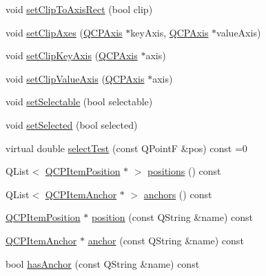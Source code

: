 \begin{DoxyCompactItemize}
\item 
void \hyperlink{classQCPAbstractItem_a39e05b9d4176b9accafc746d16ca6a06}{set\-Clip\-To\-Axis\-Rect} (bool clip)
\item 
void \hyperlink{classQCPAbstractItem_aa80abbbdcbfc40994443b03108160aee}{set\-Clip\-Axes} (\hyperlink{classQCPAxis}{Q\-C\-P\-Axis} $\ast$key\-Axis, \hyperlink{classQCPAxis}{Q\-C\-P\-Axis} $\ast$value\-Axis)
\item 
void \hyperlink{classQCPAbstractItem_a8c3e15a8a99fd011c3c017324cd9e4b1}{set\-Clip\-Key\-Axis} (\hyperlink{classQCPAxis}{Q\-C\-P\-Axis} $\ast$axis)
\item 
void \hyperlink{classQCPAbstractItem_a3cf88353e12d1d0d3bdc20a3b17e1a01}{set\-Clip\-Value\-Axis} (\hyperlink{classQCPAxis}{Q\-C\-P\-Axis} $\ast$axis)
\item 
void \hyperlink{classQCPAbstractItem_a8a8e32a55bc478b849756a78c2d87fd2}{set\-Selectable} (bool selectable)
\item 
void \hyperlink{classQCPAbstractItem_a203de94ad586cc44d16c9565f49d3378}{set\-Selected} (bool selected)
\item 
virtual double \hyperlink{classQCPAbstractItem_a2e19e88f67f4ba9c13b7e33bd447c075}{select\-Test} (const Q\-Point\-F \&pos) const =0
\item 
Q\-List$<$ \hyperlink{classQCPItemPosition}{Q\-C\-P\-Item\-Position} $\ast$ $>$ \hyperlink{classQCPAbstractItem_adf6a680cc29a6bce8345c3b6af3a91a1}{positions} () const 
\item 
Q\-List$<$ \hyperlink{classQCPItemAnchor}{Q\-C\-P\-Item\-Anchor} $\ast$ $>$ \hyperlink{classQCPAbstractItem_a8454b9941960b840608a5a1e00b1977d}{anchors} () const 
\item 
\hyperlink{classQCPItemPosition}{Q\-C\-P\-Item\-Position} $\ast$ \hyperlink{classQCPAbstractItem_af71345bd150f87fa1d2442837b87bb59}{position} (const Q\-String \&name) const 
\item 
\hyperlink{classQCPItemAnchor}{Q\-C\-P\-Item\-Anchor} $\ast$ \hyperlink{classQCPAbstractItem_abed974cba7cc02608c71dad4638e008d}{anchor} (const Q\-String \&name) const 
\item 
bool \hyperlink{classQCPAbstractItem_acbce9e5ba5252541d19db0c40303357a}{has\-Anchor} (const Q\-String \&name) const 
\end{DoxyCompactItemize}
